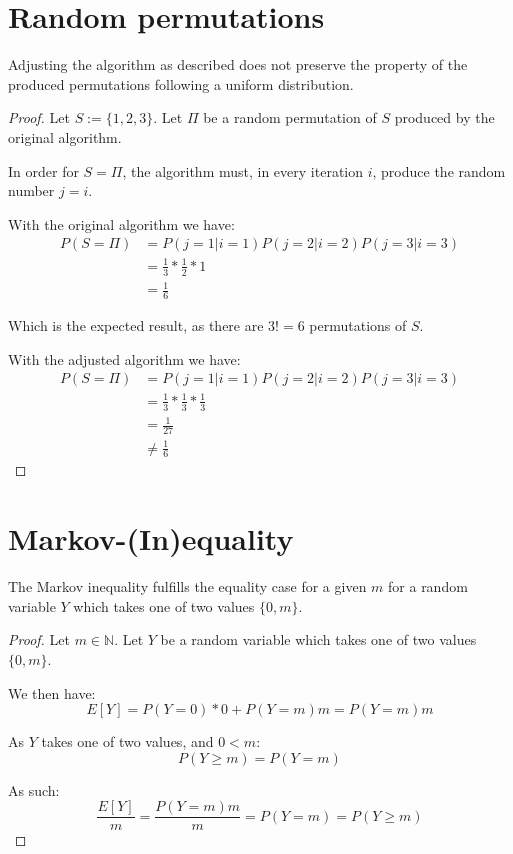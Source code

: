 \documentclass[a4paper]{scrreprt}
\begin{document}
\section{Random permutations}

Adjusting the algorithm as described does not preserve the property of the
produced permutations following a uniform distribution.

\begin{proof}
	Let $S := \{1, 2, 3\}$. Let $\Pi$ be a random permutation of $S$
	produced by the original algorithm.
	
	In order for $S = \Pi$, the algorithm must, in every iteration $i$,
	produce the random number $j = i$.

	With the original algorithm we have:
	\begin{align*}
		P(S = \Pi) & = P(j = 1 | i = 1) P(j = 2 | i = 2) P(j = 3 | i = 3) \\
		& = \frac{1}{3} * \frac{1}{2} * 1 \\
		& = \frac{1}{6}
	\end{align*}

	Which is the expected result, as there are $3! = 6$ permutations of $S$.

	With the adjusted algorithm we have:
	\begin{align*}
		P(S = \Pi) & = P(j = 1 | i = 1) P(j = 2 | i = 2) P(j = 3 | i = 3) \\
		& = \frac{1}{3} * \frac{1}{3} * \frac{1}{3} \\
		& = \frac{1}{27} \\
		& \neq \frac{1}{6}
	\end{align*}
\end{proof}

\section{Markov-(In)equality}

The Markov inequality fulfills the equality case for a given $m$ for a random
variable $Y$ which takes one of two values $\{0, m\}$.

\begin{proof}
	Let $m \in \mathbb{N}$. Let $Y$ be a random variable which takes one of
	two values $\{0, m\}$.

	We then have:
	\[
		E[Y] = P(Y = 0) * 0 + P(Y = m) m = P(Y = m) m
	\]

	As $Y$ takes one of two values, and $0 < m$:
	\[
		P(Y \geq m) = P(Y = m)
	\]

	As such:
	\[
		\frac{E[Y]}{m} = \frac{P(Y = m) m}{m} = P(Y = m) = P(Y \geq m)
	\]
\end{proof}
\end{document}
